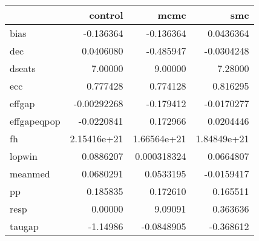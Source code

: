 \begin{tabular}{lrrr}
\toprule
{} &     control &        mcmc &         smc \\
\midrule
bias        &   -0.136364 &   -0.136364 &   0.0436364 \\
dec         &   0.0406080 &   -0.485947 &  -0.0304248 \\
dseats      &     7.00000 &     9.00000 &     7.28000 \\
ecc         &    0.777428 &    0.774128 &    0.816295 \\
effgap      & -0.00292268 &   -0.179412 &  -0.0170277 \\
effgapeqpop &  -0.0220841 &    0.172966 &   0.0204446 \\
fh          & 2.15416e+21 & 1.66564e+21 & 1.84849e+21 \\
lopwin      &   0.0886207 & 0.000318324 &   0.0664807 \\
meanmed     &   0.0680291 &   0.0533195 &  -0.0159417 \\
pp          &    0.185835 &    0.172610 &    0.165511 \\
resp        &     0.00000 &     9.09091 &    0.363636 \\
taugap      &    -1.14986 &  -0.0848905 &   -0.368612 \\
\bottomrule
\end{tabular}
